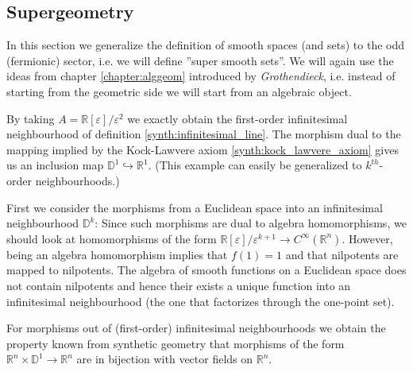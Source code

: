 \subsection{Supergeometry}

    In this section we generalize the definition of smooth spaces (and sets) to the odd (fermionic) sector, i.e. we will define ''super smooth sets''. We will again use the ideas from chapter \ref{chapter:alggeom} introduced by \textit{Grothendieck}, i.e. instead of starting from the geometric side we will start from an algebraic object.
    \begin{example}
        By taking $A=\mathbb{R}[\varepsilon]/\varepsilon^2$ we exactly obtain the first-order infinitesimal neighbourhood of definition \ref{synth:infinitesimal_line}. The morphism dual to the mapping implied by the Kock-Lawvere axiom \ref{synth:kock_lawvere_axiom} gives us an inclusion map $\mathbb{D}^1\hookrightarrow\mathbb{R}^1$. (This example can easily be generalized to $k^{th}$-order neighbourhoods.)
    \end{example}

    \begin{property}
        First we consider the morphisms from a Euclidean space into an infinitesimal neighbourhood $\mathbb{D}^k$: Since such morphisms are dual to algebra homomorphisms, we should look at homomorphisms of the form $\mathbb{R}[\varepsilon]/\varepsilon^{k+1}\rightarrow C^\infty(\mathbb{R}^n)$. However, being an algebra homomorphism implies that $f(1)=1$ and that nilpotents are mapped to nilpotents. The algebra of smooth functions on a Euclidean space does not contain nilpotents and hence their exists a unique function into an infinitesimal neighbourhood (the one that factorizes through the one-point set).

        For morphisms out of (first-order) infinitesimal neighbourhoods we obtain the property known from synthetic geometry that morphisms of the form $\mathbb{R}^n\times\mathbb{D}^1\rightarrow\mathbb{R}^n$ are in bijection with vector fields on $\mathbb{R}^n$.
    \end{property}

